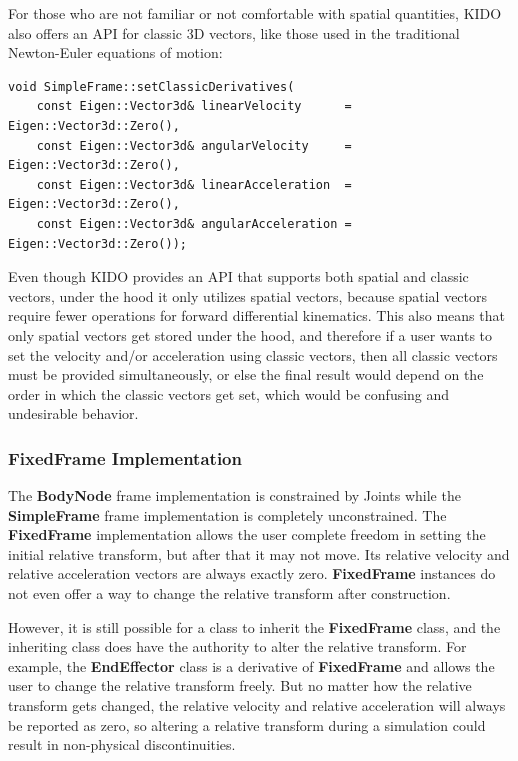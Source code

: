 For those who are not familiar or not comfortable with spatial quantities, KIDO also offers an API for classic 3D vectors, like those used in the traditional Newton-Euler equations of motion:

\begin{lstlisting}
void SimpleFrame::setClassicDerivatives(
    const Eigen::Vector3d& linearVelocity      = Eigen::Vector3d::Zero(),
    const Eigen::Vector3d& angularVelocity     = Eigen::Vector3d::Zero(),
    const Eigen::Vector3d& linearAcceleration  = Eigen::Vector3d::Zero(),
    const Eigen::Vector3d& angularAcceleration = Eigen::Vector3d::Zero());
\end{lstlisting}

Even though KIDO provides an API that supports both spatial and classic vectors, under the hood it only utilizes spatial vectors, because spatial vectors require fewer operations for forward differential kinematics. This also means that only spatial vectors get stored under the hood, and therefore if a user wants to set the velocity and/or acceleration using classic vectors, then all classic vectors must be provided simultaneously, or else the final result would depend on the order in which the classic vectors get set, which would be confusing and undesirable behavior.

\subsubsection{FixedFrame Implementation}

The \textbf{BodyNode} frame implementation is constrained by Joints while the \textbf{SimpleFrame} frame implementation is completely unconstrained. The \textbf{FixedFrame} implementation allows the user complete freedom in setting the initial relative transform, but after that it may not move. Its relative velocity and relative acceleration vectors are always exactly zero. \textbf{FixedFrame} instances do not even offer a way to change the relative transform after construction.

However, it is still possible for a class to inherit the \textbf{FixedFrame} class, and the inheriting class does have the authority to alter the relative transform. For example, the \textbf{EndEffector} class is a derivative of \textbf{FixedFrame} and allows the user to change the relative transform freely. But no matter how the relative transform gets changed, the relative velocity and relative acceleration will always be reported as zero, so altering a relative transform during a simulation could result in non-physical discontinuities.

